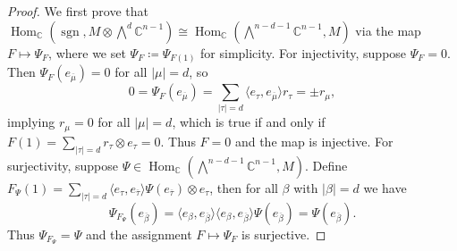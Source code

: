 \documentclass[11pt, reqno]{amsart}
\theoremstyle{definition}
\theoremstyle{remark}
\numberwithin{equation}{section}
\newcommand{\0}{\emptyset}
\newcommand{\C}{\mathbb{C}}
\DeclareMathOperator{\sgn}{sgn}
\DeclareMathOperator{\Hom}{Hom}
\begin{document}
\begin{proof}
    We first prove that $\Hom_{\C}\left(\sgn, M \otimes \bigwedge\nolimits^d \C^{n-1}\right) \cong 
    \Hom_{\C}\left(\bigwedge\nolimits^{n-d-1} \C^{n-1}, M\right)$ via the map $F \mapsto \Psi_F$, 
    where we set $\Psi_F\coloneqq \Psi_{F(1)}$ for simplicity. 
    For injectivity, suppose $\Psi_F=0$. 
    Then $\Psi_F(e_{\overline{\mu}})=0$ for all $|\mu|=d$, so 
    \[
        0 = \Psi_F(e_{\overline{\mu}}) 
        = \sum_{|\tau| = d} \langle e_\tau, e_{\overline{\mu}}\rangle r_\tau = \pm r_\mu, 
    \]
    implying $r_\mu =0$ for all $|\mu|=d$, which is true if and only if 
    $F(1) = \sum_{|\tau| = d} r_\tau \otimes e_\tau =0$. 
    Thus $F=0$ and the map is injective. 
    For surjectivity, suppose $\Psi \in \Hom_{\C}\left(\bigwedge\nolimits^{n-d-1}\C^{n-1}, M\right)$. 
    Define $F_\Psi(1) = \sum_{|\tau|=d} \langle e_\tau, e_{\overline{\tau}} \rangle 
    \Psi(e_{\overline{\tau}}) \otimes e_\tau$, then for all $\beta$ with $|\beta|=d$ we have 
    \begin{equation}\label{eq:F-Psi-surjectivity}
        \Psi_{F_{\Psi}}(e_{\overline{\beta}}) = 
        \langle e_\beta, e_{\overline{\beta}} \rangle 
        \langle e_\beta, e_{\overline{\beta}} \rangle \Psi(e_{\overline{\beta}}) = 
        \Psi(e_{\overline{\beta}}). 
    \end{equation}
    Thus $\Psi_{F_\Psi} = \Psi$ and the assignment $F \mapsto \Psi_F$ is surjective. 


\end{proof}
\end{document}

